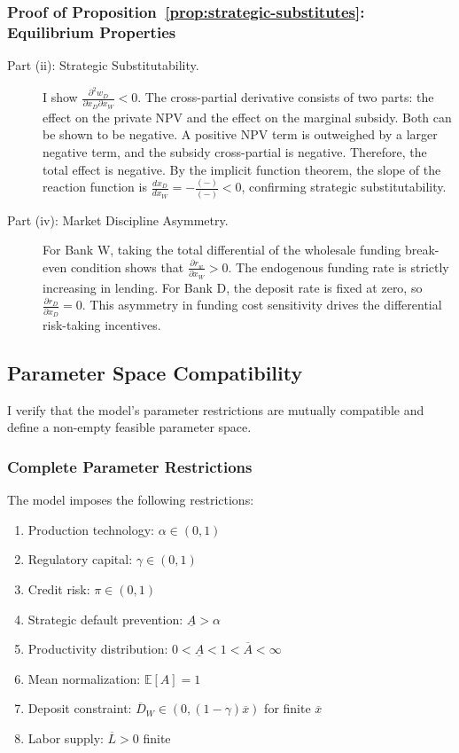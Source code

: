 \documentclass[12pt]{article}
\begin{document}
\subsubsection{Proof of Proposition~\ref{prop:strategic-substitutes}: Equilibrium Properties}
\label{app:proof-prop6-4}
\begin{description}
    \item[Part (ii): Strategic Substitutability.] I show $\frac{\partial^{2}w_{D}}{\partial x_{D}\partial x_{W}} < 0$. The cross-partial derivative consists of two parts: the effect on the private NPV and the effect on the marginal subsidy. Both can be shown to be negative. A positive NPV term is outweighed by a larger negative term, and the subsidy cross-partial is negative. Therefore, the total effect is negative. By the implicit function theorem, the slope of the reaction function is $\frac{dx_{D}}{dx_{W}} = - \frac{(-)}{(-)} < 0$, confirming strategic substitutability.
    
    \item[Part (iv): Market Discipline Asymmetry.] For Bank W, taking the total differential of the wholesale funding break-even condition shows that $\frac{\partial r_{w}}{\partial x_{W}} > 0$. The endogenous funding rate is strictly increasing in lending. For Bank D, the deposit rate is fixed at zero, so $\frac{\partial r_{D}}{\partial x_{D}} = 0$. This asymmetry in funding cost sensitivity drives the differential risk-taking incentives.
\end{description}
\subsection{Parameter Space Compatibility}
\label{app:param-compat}
I verify that the model's parameter restrictions are mutually compatible and define a non-empty feasible parameter space.

\subsubsection{Complete Parameter Restrictions}
The model imposes the following restrictions:
\begin{enumerate}
    \item Production technology: $\alpha \in (0,1)$
    \item Regulatory capital: $\gamma \in (0,1)$
    \item Credit risk: $\pi \in (0,1)$
    \item Strategic default prevention: $\underline{A} > \alpha$
    \item Productivity distribution: $0 < \underline{A} < 1 < \overline{A} < \infty$
    \item Mean normalization: $\mathbb{E}[A] = 1$
    \item Deposit constraint: $\overline{D}_{W} \in (0, (1-\gamma)\overline{x})$ for finite $\overline{x}$
    \item Labor supply: $\overline{L} > 0$ finite
\end{enumerate}
\end{document}
